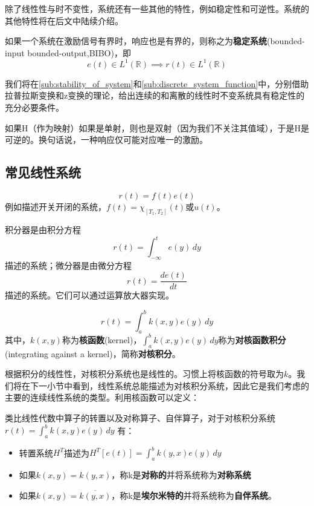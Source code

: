 \documentclass{ctexbook}
\begin{document}
除了线性性与时不变性，系统还有一些其他的特性，例如稳定性和可逆性。系统的其他特性将在后文中陆续介绍。

\begin{definition}[稳定性]
如果一个系统在激励信号有界时，响应也是有界的，则称之为\textbf{稳定系统}(bounded-input bounded-output,BIBO)，即
\[e(t)\in L^1(\mathbb{R})\implies r(t)\in L^1(\mathbb{R})\]
\end{definition}
我们将在\ref{sub:stability_of_system}和\ref{sub:discrete_system_function}中，分别借助拉普拉斯变换和z变换的理论，给出连续的和离散的线性时不变系统具有稳定性的充分必要条件。

\begin{definition}[可逆性]
    如果H（作为映射）如果是单射，则也是双射（因为我们不关注其值域），于是H是可逆的。换句话说，一种响应仅可能对应唯一的激励。
\end{definition}

\subsection{常见线性系统}\label{sub:ordinary_system}

\begin{example}[时域乘积]
\begin{equation*}
    r(t)=f(t)e(t)
\end{equation*}
例如描述开关开闭的系统，$f(t)=\chi_{[T_1,T_2]}(t)$或$u(t)$。
\end{example}

\begin{example}[微分器与积分器]
    积分器是由积分方程$$r(t)=\int_{-\infty}^{t}e(y)\,dy$$描述的系统；微分器是由微分方程$$r(t)=\frac{de(t)}{dt}$$描述的系统。它们可以通过运算放大器实现。
\end{example}

\begin{example}[对核积分]
\begin{equation*}
    r(t)=\int_{a}^{b}k(x,y)e(y)\,dy
\end{equation*}
其中，$k(x,y)$称为\textbf{核函数}(kernel)，$\int_{a}^{b}k(x,y)e(y)\,dy$称为\textbf{对核函数积分}(integrating against a kernel)，简称\textbf{对核积分}。
\end{example}
根据积分的线性性，对核积分系统也是线性的。习惯上将核函数的符号取为$k$。我们将在下一小节中看到，线性系统总能描述为对核积分系统，因此它是我们考虑的主要的连续线性系统的类型。利用核函数可以定义：

\begin{definition}[转置系统对称系统与自伴系统]
    类比线性代数中算子的转置以及对称算子、自伴算子，对于对核积分系统
    $r(t)=\int_{a}^{b}k(x,y)e(y)\,dy$
    有：
\begin{itemize}
    \item 转置系统$H^T$描述为$H^T[e(t)]=\int_{a}^{b}k(y,x)e(y)\,dy$
    \item 如果$k(x,y)=k(y,x)$，称k是\textbf{对称的}并将系统称为\textbf{对称系统}
    \item 如果$k(x,y)=\overline{k(y,x)}$，称k是\textbf{埃尔米特的}并将系统称为\textbf{自伴系统}。
\end{itemize}
\end{definition}
\end{document}
